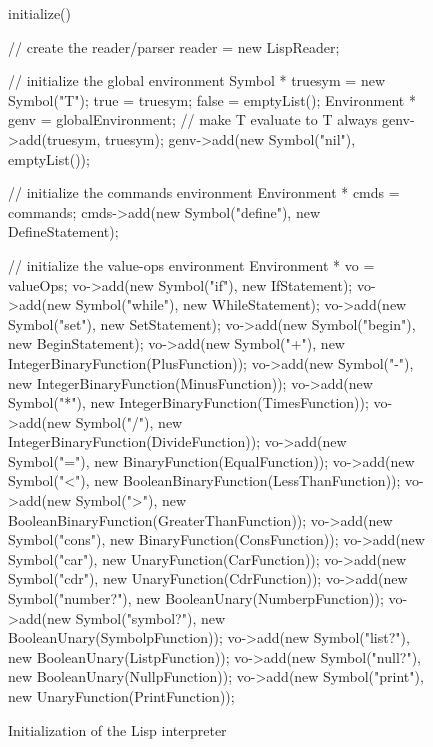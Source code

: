 \begin{figure}
\begin{cprog}
initialize()
{

	// create the reader/parser 
	reader = new LispReader;

	// initialize the global environment
	Symbol * truesym = new Symbol("T");
	true = truesym;
	false = emptyList();
	Environment * genv = globalEnvironment;
	// make T evaluate to T always
	genv->add(truesym, truesym);
	genv->add(new Symbol("nil"), emptyList());

	// initialize the commands environment
	Environment * cmds = commands;
	cmds->add(new Symbol("define"), new DefineStatement);

	// initialize the value-ops environment
	Environment * vo = valueOps;
	vo->add(new Symbol("if"), new IfStatement);
	vo->add(new Symbol("while"), new WhileStatement);
	vo->add(new Symbol("set"), new SetStatement);
	vo->add(new Symbol("begin"), new BeginStatement);
	vo->add(new Symbol("+"), new IntegerBinaryFunction(PlusFunction));
	vo->add(new Symbol("-"), new IntegerBinaryFunction(MinusFunction));
	vo->add(new Symbol("*"), new IntegerBinaryFunction(TimesFunction));
	vo->add(new Symbol("/"), new IntegerBinaryFunction(DivideFunction));
	vo->add(new Symbol("="), new BinaryFunction(EqualFunction));
	vo->add(new Symbol("<"), new BooleanBinaryFunction(LessThanFunction));
	vo->add(new Symbol(">"), new BooleanBinaryFunction(GreaterThanFunction));
	vo->add(new Symbol("cons"), new BinaryFunction(ConsFunction));
	vo->add(new Symbol("car"), new UnaryFunction(CarFunction));
	vo->add(new Symbol("cdr"), new UnaryFunction(CdrFunction));
	vo->add(new Symbol("number?"), new BooleanUnary(NumberpFunction));
	vo->add(new Symbol("symbol?"), new BooleanUnary(SymbolpFunction));
	vo->add(new Symbol("list?"), new BooleanUnary(ListpFunction));
	vo->add(new Symbol("null?"), new BooleanUnary(NullpFunction));
	vo->add(new Symbol("print"), new UnaryFunction(PrintFunction));
}
\end{cprog}
\caption{Initialization of the Lisp interpreter}\label{chap2init}
\end{figure}

